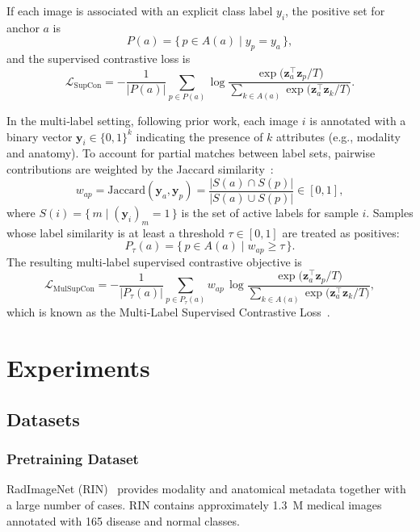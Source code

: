 \documentclass[final,1p,times]{elsarticle}
\begin{document}
If each image is associated with an explicit class label $y_i$,
the positive set for anchor $a$ is
\[
  P(a)=\{\,p \in A(a)\mid y_p=y_a\,\},
\]
and the supervised contrastive loss is~\cite{khosla2020supervised}
\begin{equation}
  \mathcal{L}_{\mathrm{SupCon}}
  = -\frac{1}{|P(a)|}
    \sum_{p\in P(a)}
    \log\frac{\exp\!\bigl(\mathbf z_a^{\top}\mathbf z_p/T\bigr)}
              {\displaystyle\sum_{k \in A(a)}
               \exp\!\bigl(\mathbf z_a^{\top}\mathbf z_k/T\bigr)} .
  \label{eq:step2}
\end{equation}

In the multi‑label setting, following prior work, each image $i$ is annotated with a binary vector $\mathbf y_i \in \{0,1\}^{k}$ indicating the presence of $k$ attributes (e.g., modality and anatomy). To account for partial matches between label sets, pairwise contributions are weighted by the Jaccard similarity~\cite{zaigrajew_contrastive_2022}:
\[
  w_{ap}
  = \mathrm{Jaccard}(\mathbf y_a,\mathbf y_p)
  = \frac{\lvert S(a)\cap S(p)\rvert}{\lvert S(a)\cup S(p)\rvert}
  \in [0,1],
\]
where $S(i)=\{\,m\mid (\mathbf y_i)_m=1\,\}$ is the set of active labels for sample $i$. Samples whose label similarity is at least a threshold $\tau \in [0,1]$ are treated as positives:
\[
  P_{\tau}(a)=\{\,p \in A(a)\mid w_{ap}\ge \tau\,\}.
\]
The resulting multi‑label supervised contrastive objective is
\begin{equation}
  \mathcal{L}_{\mathrm{MulSupCon}}
  = -\frac{1}{\lvert P_{\tau}(a)\rvert}
    \sum_{p\in P_{\tau}(a)}
    w_{ap}\,
    \log
    \frac{\exp\!\bigl(\mathbf z_a^{\top}\mathbf z_p/T\bigr)}
         {\displaystyle\sum_{k\in A(a)}
          \exp\!\bigl(\mathbf z_a^{\top}\mathbf z_k/T\bigr)} ,
  \label{eq:supcon-ja}
\end{equation}
which is known as the Multi‑Label Supervised Contrastive Loss~\cite{zaigrajew_contrastive_2022}.

\section{Experiments}
\subsection{Datasets}
\subsubsection{Pretraining Dataset}
\label{ssec:dataset-ja}
RadImageNet (RIN)~\cite{mei_radimagenet_2022} provides modality and anatomical metadata together with a large number of cases.
RIN contains approximately 1.3~M medical images annotated with 165 disease and normal classes.
\end{document}
